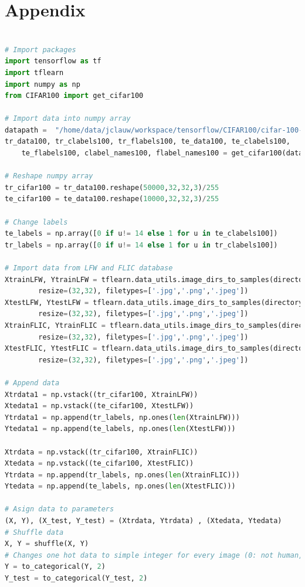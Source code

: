 \section{Appendix}
\lstset{upquote=true}
\begin{lstlisting}[caption= Code used to import and train the model classifying humans from no humnans, label=fullCode, basicstyle=\ttfamily\tiny, language=Python, stringstyle=\ttfamily,]

# Import packages
import tensorflow as tf
import tflearn
import numpy as np
from CIFAR100 import get_cifar100

# Import data into numpy array
datapath =  "/home/data/jclauw/workspace/tensorflow/CIFAR100/cifar-100-python/" 
tr_data100, tr_clabels100, tr_flabels100, te_data100, te_clabels100, 
	te_flabels100, clabel_names100, flabel_names100 = get_cifar100(datapath)  

# Reshape numpy array
tr_cifar100 = tr_data100.reshape(50000,32,32,3)/255
te_cifar100 = te_data100.reshape(10000,32,32,3)/255

# Change labels
te_labels = np.array([0 if u!= 14 else 1 for u in te_clabels100])
tr_labels = np.array([0 if u!= 14 else 1 for u in tr_clabels100])

# Import data from LFW and FLIC database
XtrainLFW, YtrainLFW = tflearn.data_utils.image_dirs_to_samples(directory='~/', 
		resize=(32,32), filetypes=['.jpg','.png','.jpeg'])
XtestLFW, YtestLFW = tflearn.data_utils.image_dirs_to_samples(directory='~/', 
		resize=(32,32), filetypes=['.jpg','.png','.jpeg'])
XtrainFLIC, YtrainFLIC = tflearn.data_utils.image_dirs_to_samples(directory='~/', 
		resize=(32,32), filetypes=['.jpg','.png','.jpeg'])
XtestFLIC, YtestFLIC = tflearn.data_utils.image_dirs_to_samples(directory='~/', 
		resize=(32,32), filetypes=['.jpg','.png','.jpeg'])

# Append data
Xtrdata1 = np.vstack((tr_cifar100, XtrainLFW))
Xtedata1 = np.vstack((te_cifar100, XtestLFW))
Ytrdata1 = np.append(tr_labels, np.ones(len(XtrainLFW)))
Ytedata1 = np.append(te_labels, np.ones(len(XtestLFW)))

Xtrdata = np.vstack((tr_cifar100, XtrainFLIC))
Xtedata = np.vstack((te_cifar100, XtestFLIC))
Ytrdata = np.append(tr_labels, np.ones(len(XtrainFLIC)))
Ytedata = np.append(te_labels, np.ones(len(XtestFLIC)))

# Asign data to parameters
(X, Y), (X_test, Y_test) = (Xtrdata, Ytrdata) , (Xtedata, Ytedata)
# Shuffle data
X, Y = shuffle(X, Y)
# Changes one hot data to simple integer for every image (0: not human, 1: human)
Y = to_categorical(Y, 2)
Y_test = to_categorical(Y_test, 2)


\end{lstlisting}
